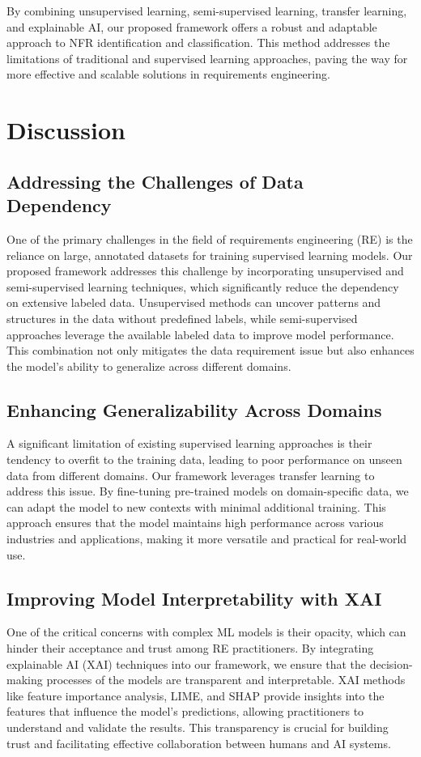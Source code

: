 \documentclass[sigconf,natbib=false]{acmart}
\begin{document}
By combining unsupervised learning, semi-supervised learning, transfer learning, and explainable AI, our proposed framework offers a robust and adaptable approach to NFR identification and classification. This method addresses the limitations of traditional and supervised learning approaches, paving the way for more effective and scalable solutions in requirements engineering.

\section{Discussion}

\subsection{Addressing the Challenges of Data Dependency}
One of the primary challenges in the field of requirements engineering (RE) is the reliance on large, annotated datasets for training supervised learning models. Our proposed framework addresses this challenge by incorporating unsupervised and semi-supervised learning techniques, which significantly reduce the dependency on extensive labeled data. Unsupervised methods can uncover patterns and structures in the data without predefined labels, while semi-supervised approaches leverage the available labeled data to improve model performance. This combination not only mitigates the data requirement issue but also enhances the model's ability to generalize across different domains.

\subsection{Enhancing Generalizability Across Domains}
A significant limitation of existing supervised learning approaches is their tendency to overfit to the training data, leading to poor performance on unseen data from different domains. Our framework leverages transfer learning to address this issue. By fine-tuning pre-trained models on domain-specific data, we can adapt the model to new contexts with minimal additional training. This approach ensures that the model maintains high performance across various industries and applications, making it more versatile and practical for real-world use.

\subsection{Improving Model Interpretability with XAI}
One of the critical concerns with complex ML models is their opacity, which can hinder their acceptance and trust among RE practitioners. By integrating explainable AI (XAI) techniques into our framework, we ensure that the decision-making processes of the models are transparent and interpretable. XAI methods like feature importance analysis, LIME, and SHAP provide insights into the features that influence the model's predictions, allowing practitioners to understand and validate the results. This transparency is crucial for building trust and facilitating effective collaboration between humans and AI systems.
\end{document}
